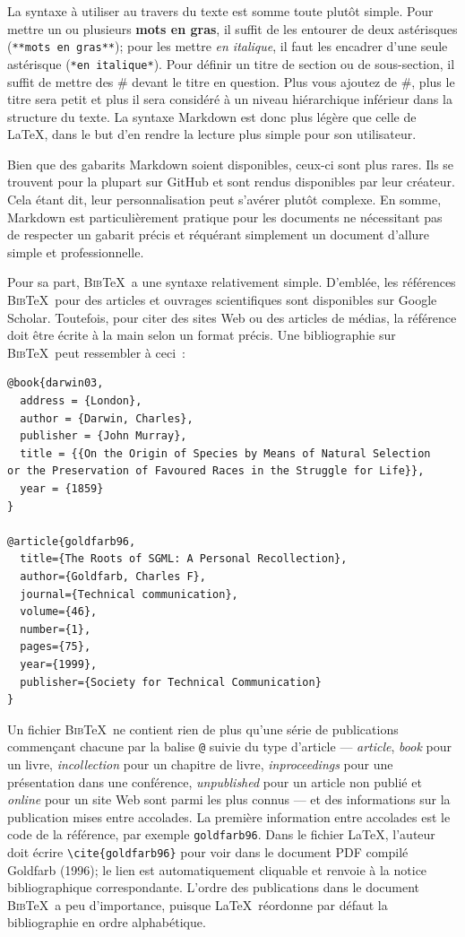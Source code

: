 \documentclass[
  letterpaper,
]{scrbook}
\begin{document}
La syntaxe à utiliser au travers du texte est somme toute plutôt simple.
Pour mettre un ou plusieurs \textbf{mots en gras}, il suffit de les
entourer de deux astérisques (\texttt{**mots\ en\ gras**}); pour les
mettre \emph{en italique}, il faut les encadrer d'une seule astérisque
(\texttt{*en\ italique*}). Pour définir un titre de section ou de
sous-section, il suffit de mettre des \# devant le titre en question.
Plus vous ajoutez de \#, plus le titre sera petit et plus il sera
considéré à un niveau hiérarchique inférieur dans la structure du texte.
La syntaxe Markdown est donc plus légère que celle de \LaTeX, dans le
but d'en rendre la lecture plus simple pour son utilisateur.

Bien que des gabarits Markdown soient disponibles, ceux-ci sont plus
rares. Ils se trouvent pour la plupart sur GitHub et sont rendus
disponibles par leur créateur. Cela étant dit, leur personnalisation
peut s'avérer plutôt complexe. En somme, Markdown est particulièrement
pratique pour les documents ne nécessitant pas de respecter un gabarit
précis et réquérant simplement un document d'allure simple et
professionnelle.

Pour sa part, \textsc{Bib}\TeX~a une syntaxe relativement simple.
D'emblée, les références \textsc{Bib}\TeX~pour des articles et ouvrages
scientifiques sont disponibles sur Google Scholar. Toutefois, pour citer
des sites Web ou des articles de médias, la référence doit être écrite à
la main selon un format précis. Une bibliographie sur
\textsc{Bib}\TeX~peut ressembler à ceci~:

\begin{verbatim}
@book{darwin03,
  address = {London},
  author = {Darwin, Charles},
  publisher = {John Murray},
  title = {{On the Origin of Species by Means of Natural Selection
or the Preservation of Favoured Races in the Struggle for Life}},
  year = {1859}
}

@article{goldfarb96,
  title={The Roots of SGML: A Personal Recollection},
  author={Goldfarb, Charles F},
  journal={Technical communication},
  volume={46},
  number={1},
  pages={75},
  year={1999},
  publisher={Society for Technical Communication}
}
\end{verbatim}

Un fichier \textsc{Bib}\TeX~ne contient rien de plus qu'une série de
publications commençant chacune par la balise \texttt{@} suivie du type
d'article --- \emph{article}, \emph{book} pour un livre,
\emph{incollection} pour un chapitre de livre, \emph{inproceedings} pour
une présentation dans une conférence, \emph{unpublished} pour un article
non publié et \emph{online} pour un site Web sont parmi les plus connus
--- et des informations sur la publication mises entre accolades. La
première information entre accolades est le code de la référence, par
exemple \texttt{goldfarb96}. Dans le fichier \LaTeX, l'auteur doit
écrire \texttt{\textbackslash{}cite\{goldfarb96\}} pour voir dans le
document PDF compilé Goldfarb (1996); le lien est automatiquement
cliquable et renvoie à la notice bibliographique correspondante. L'ordre
des publications dans le document \textsc{Bib}\TeX~a peu d'importance,
puisque \LaTeX~réordonne par défaut la bibliographie en ordre
alphabétique.
\end{document}
